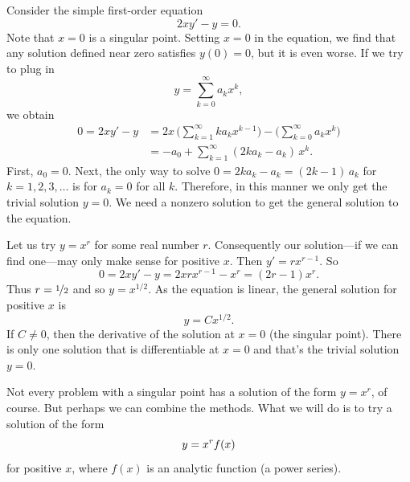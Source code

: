 \begin{example}
Consider the simple first-order equation 
\begin{equation*}
2 x y' - y = 0 .
\end{equation*}
Note that $x=0$ is a singular point.
Setting $x=0$ in the equation, we find
that any solution defined near zero satisfies
$y(0)=0$, but it is even worse.
If we try to plug in
\begin{equation*}
y = \sum_{k=0}^\infty a_k x^k ,
\end{equation*}
we obtain
\begin{equation*}
\begin{split}
0 = 2 xy'-y &= 
2x \, \Biggl( \sum_{k=1}^\infty k a_k x^{k-1}  \Biggr)
-
\Biggl( \sum_{k=0}^\infty a_k x^k \Biggr)
\\
& =
-a_0 + 
\sum_{k=1}^\infty (2 k a_k - a_k) \, x^{k} .
\end{split}
\end{equation*}
First, $a_0 = 0$.  Next, the only way to solve
$0 = 2 k a_k - a_k = (2k-1) \, a_k$
for $k = 1,2,3,\dots$ is for $a_k = 0$ for all $k$.
Therefore, in this manner we only get the trivial solution $y=0$.  We need
a nonzero solution to get the general solution to the equation.

Let us try $y=x^r$
for some real number $r$.  
Consequently our solution---if we can
find one---may only make sense for positive $x$.
Then $y' = r x^{r-1}$.  So
\begin{equation*}
0 = 2 x y' - y = 2 x r x^{r-1} - x^r = (2r-1) x^r .
\end{equation*}
Thus $r= \nicefrac{1}{2}$ and so $y = x^{1/2}$.
As the equation is linear,
the general solution for positive $x$ is
\begin{equation*}
y = C x^{1/2} .
\end{equation*}
If $C \neq 0$, then
the derivative of the solution  at $x=0$ (the
singular point).  There is only one solution that is differentiable
at $x=0$ and that's the trivial solution $y=0$.
\end{example}

Not every problem with a singular point has a solution of the form $y=x^r$, of
course.  But perhaps we can combine the methods.  What we will do is
to try a solution of the form
\begin{equation*}
y = x^r f(x)
\avoidbreak
\end{equation*}
for positive $x$,
where $f(x)$ is an analytic function (a power series).

